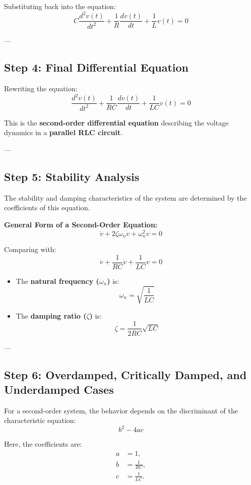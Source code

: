 \documentclass[12pt]{article}
\begin{document}
Substituting back into the equation:
\[
C \frac{d^2v(t)}{dt^2} + \frac{1}{R} \frac{dv(t)}{dt} + \frac{1}{L} v(t) = 0 \tag{2}
\]

---

\subsection*{Step 4: Final Differential Equation}

Rewriting the equation:
\[
\frac{d^2v(t)}{dt^2} + \frac{1}{RC} \frac{dv(t)}{dt} + \frac{1}{LC} v(t) = 0 \tag{3}
\]

This is the \textbf{second-order differential equation} describing the voltage dynamics in a \textbf{parallel RLC circuit}.

---

\subsection*{Step 5: Stability Analysis}

The stability and damping characteristics of the system are determined by the coefficients of this equation.

\textbf{General Form of a Second-Order Equation:}
\[
\ddot{v} + 2\zeta\omega_n \dot{v} + \omega_n^2 v = 0
\]

Comparing with:
\[
\ddot{v} + \frac{1}{RC} \dot{v} + \frac{1}{LC} v = 0
\]

\begin{itemize}
    \item The \textbf{natural frequency (\(\omega_n\))} is:
    \[
    \omega_n = \sqrt{\frac{1}{LC}}
    \]

    \item The \textbf{damping ratio (\(\zeta\))} is:
    \[
    \zeta = \frac{1}{2RC} \sqrt{LC}
    \]
\end{itemize}

---

\subsection*{Step 6: Overdamped, Critically Damped, and Underdamped Cases}

For a second-order system, the behavior depends on the discriminant of the characteristic equation:
\[
b^2 - 4ac
\]

Here, the coefficients are:
\begin{align*}
    a &= 1, \\
    b &= \frac{1}{RC}, \\
    c &= \frac{1}{LC}.
\end{align*}
\end{document}
